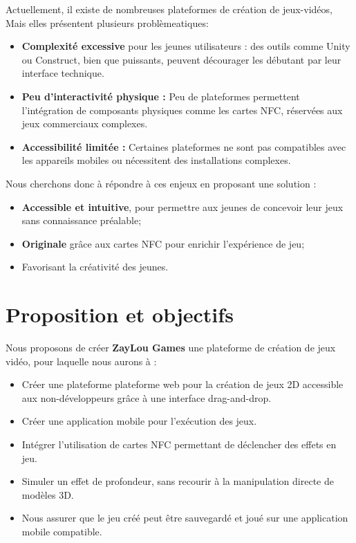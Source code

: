 \documentclass{article}                             %
\begin{document}
Actuellement, il existe de nombreuses plateformes de création de jeux-vidéos,
Mais elles présentent plusieurs problèmeatiques:

\begin{itemize}
  \item \textbf{Complexité excessive} pour les jeunes utilisateurs : des outils comme Unity 
  ou Construct, bien que puissants, peuvent décourager les débutant par leur interface technique.
  \item \textbf{Peu d’interactivité physique :} Peu de plateformes permettent l'intégration de composants
    physiques comme les cartes NFC, réservées aux jeux commerciaux complexes.
  \item \textbf{Accessibilité limitée :} Certaines plateformes ne sont pas compatibles avec les appareils mobiles ou 
  nécessitent des installations complexes.
\end{itemize}

Nous cherchons donc à répondre à ces enjeux en proposant une solution :
\begin{itemize}
  \item \textbf{Accessible et intuitive}, pour permettre aux jeunes de concevoir leur jeux sans 
  connaissance préalable;
  \item \textbf{Originale} grâce aux cartes NFC pour enrichir l'expérience de jeu;
  \item Favorisant la créativité des jeunes.
\end{itemize}


\section{Proposition et objectifs}
\label{sec:proposition}                            %
Nous proposons de créer \textbf{ZayLou Games} une plateforme de création de jeux vidéo, pour
laquelle nous aurons à :
\begin{itemize}[leftmargin=1.5em]
  \item Créer une plateforme plateforme web pour la création de jeux 2D accessible aux non-développeurs grâce à une interface drag-and-drop.
  \item Créer une application mobile pour l'exécution des jeux.
  \item Intégrer l’utilisation de cartes NFC permettant de déclencher des effets en jeu.
  \item Simuler un effet de profondeur, sans recourir à la manipulation directe de modèles 3D.
  \item Nous assurer que le jeu créé peut être sauvegardé et joué sur une application mobile compatible.
\end{itemize}
\end{document}
